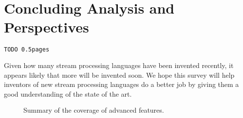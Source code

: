 \section{Concluding Analysis and Perspectives}\label{sec:conclusion}

\begin{alltt}TODO\scriptsize ~0.5 pages
\end{alltt}


Given how many stream processing languages have been invented recently, it appears likely that more will be invented soon. We hope this survey will help inventors of new stream processing languages do a better job by giving them a good understanding of the state of the art.

\begin{figure*}\scriptsize\centering

\vspace*{-0.2cm}
\caption{Summary of the coverage of advanced features.}
\vspace*{-0.3cm}
\end{figure*} 